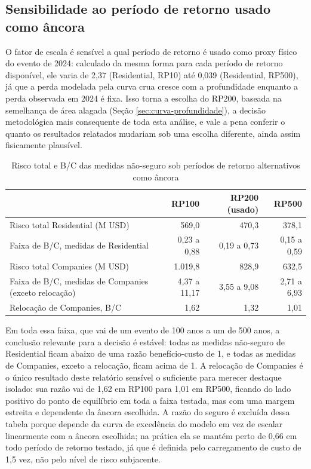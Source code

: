 \documentclass[11pt]{article}
\begin{document}
\subsection{Sensibilidade ao período de retorno usado como âncora}
\label{sec:sensibilidade}

O fator de escala é sensível a qual período de retorno é usado como proxy físico do
evento de 2024: calculado da mesma forma para cada período de retorno disponível, ele varia
de 2,37 (Residential, RP10) até 0,039 (Residential, RP500), já que a perda modelada pela
curva crua cresce com a profundidade enquanto a perda observada em 2024 é fixa. Isso torna
a escolha do RP200, baseada na semelhança de área alagada (Seção \ref{sec:curva-profundidade}),
a decisão metodológica mais consequente de toda esta análise, e vale a pena conferir o
quanto os resultados relatados mudariam sob uma escolha diferente, ainda assim fisicamente
plausível.

\begin{table}[H]
\centering
\caption{Risco total e B/C das medidas não-seguro sob períodos de retorno alternativos como âncora}
\label{tab:sensibilidade}
\small
\begin{tabular}{lrrr}
\toprule
& RP100 & RP200 (usado) & RP500 \\
\midrule
Risco total Residential (M USD) & 569,0 & 470,3 & 378,1 \\
Faixa de B/C, medidas de Residential & 0,23 a 0,88 & 0,19 a 0,73 & 0,15 a 0,59 \\
Risco total Companies (M USD) & 1.019,8 & 828,9 & 632,5 \\
Faixa de B/C, medidas de Companies (exceto relocação) & 4,37 a 11,17 & 3,55 a 9,08 & 2,71 a 6,93 \\
Relocação de Companies, B/C & 1,62 & 1,32 & 1,01 \\
\bottomrule
\end{tabular}
\end{table}

Em toda essa faixa, que vai de um evento de 100 anos a um de 500 anos, a conclusão
relevante para a decisão é estável: todas as medidas não-seguro de Residential ficam
abaixo de uma razão benefício-custo de 1, e todas as medidas de Companies, exceto a
relocação, ficam acima de 1. A relocação de Companies é o único resultado deste relatório
sensível o suficiente para merecer destaque isolado: sua razão vai de 1,62 em RP100 para
1,01 em RP500, ficando do lado positivo do ponto de equilíbrio em toda a faixa testada, mas
com uma margem estreita e dependente da âncora escolhida. A razão do seguro é excluída
dessa tabela porque depende da curva de excedência do modelo em vez de escalar
linearmente com a âncora escolhida; na prática ela se mantém perto de 0,66 em todo período
de retorno testado, já que é definida pelo carregamento de custo de 1,5 vez, não pelo nível
de risco subjacente.
\end{document}
